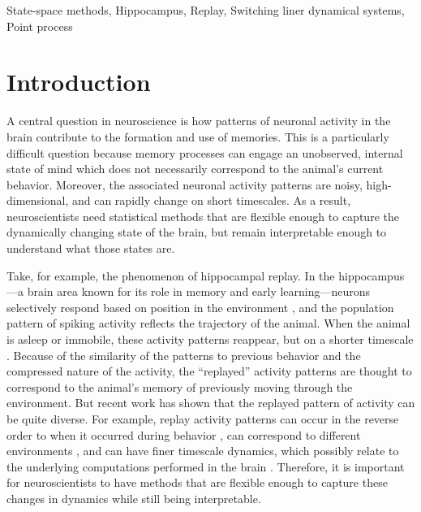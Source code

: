 \documentclass[conference]{IEEEtran}
\begin{document}
\begin{IEEEkeywords}
State-space methods, Hippocampus, Replay, Switching liner dynamical systems, Point process
\end{IEEEkeywords}

\section{Introduction}
A central question in neuroscience is how patterns of neuronal activity in the brain contribute to the formation and use of memories. This is a particularly difficult question because memory processes can engage an unobserved, internal state of mind which does not necessarily correspond to the animal's current behavior. Moreover, the associated neuronal activity patterns are noisy, high-dimensional, and can rapidly change on short timescales. As a result, neuroscientists need statistical methods that are flexible enough to capture the dynamically changing state of the brain, but remain interpretable enough to understand what those states are.

Take, for example, the phenomenon of hippocampal replay. In the hippocampus---a brain area known for its role in memory and early learning---neurons selectively respond based on position in the environment \cite{OKeefehippocampusspatialmap1971}, and the population pattern of spiking activity reflects the trajectory of the animal. When the animal is asleep or immobile, these activity patterns reappear, but on a shorter timescale \cite{WilsonReactivationhippocampalensemble1994, NadasdyReplayTimeCompression1999}. Because of the similarity of the patterns to previous behavior and the compressed nature of the activity, the “replayed” activity patterns are thought to correspond to the animal's memory of previously moving through the environment. But recent work has shown that the replayed pattern of activity can be quite diverse. For example, replay activity patterns can occur in the reverse order to when it occurred during behavior \cite{FosterReversereplaybehavioural2006, DibaForwardreversehippocampal2007}, can correspond to different environments \cite{KarlssonAwakereplayremote2009}, and can have finer timescale dynamics, which possibly relate to the underlying computations performed in the brain \cite{PfeifferAutoassociativedynamicsgeneration2015}. Therefore, it is important for neuroscientists to have methods that are flexible enough to capture these changes in dynamics while still being interpretable.
\end{document}
